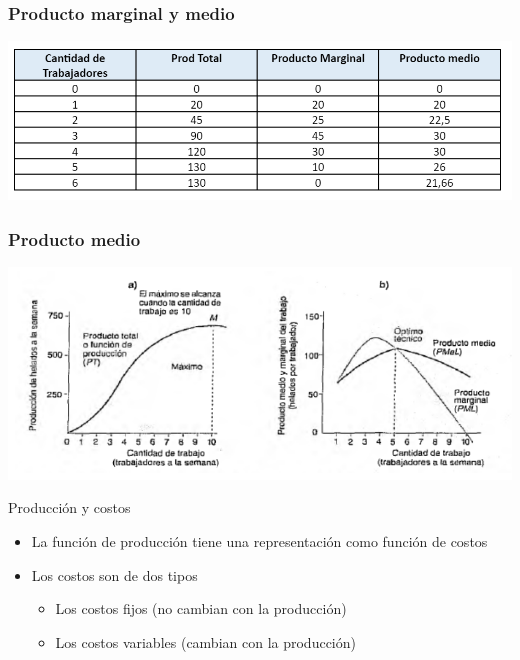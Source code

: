 \documentclass{beamer}
\begin{document}
\begin{frame}
\frametitle{Producto marginal y medio}
\centering
\includegraphics[scale=0.6]{Slides Principios de Economia/Figures/Prod1.png}
\end{frame}


\begin{frame}
\frametitle{Producto medio}
\centering
\includegraphics[scale=0.6]{Slides Principios de Economia/Figures/Prod2.png}
\end{frame}

\begin{frame}{Producción y costos}
\begin{itemize}
    \item La función de producción tiene una representación como función de costos
      \item Los costos son de dos tipos
      \begin{itemize} 
      \item Los costos fijos (no cambian con la producción)
      \item Los costos variables (cambian con la producción)
      \end{itemize}
\end{itemize}
\end{frame}
\end{document}
